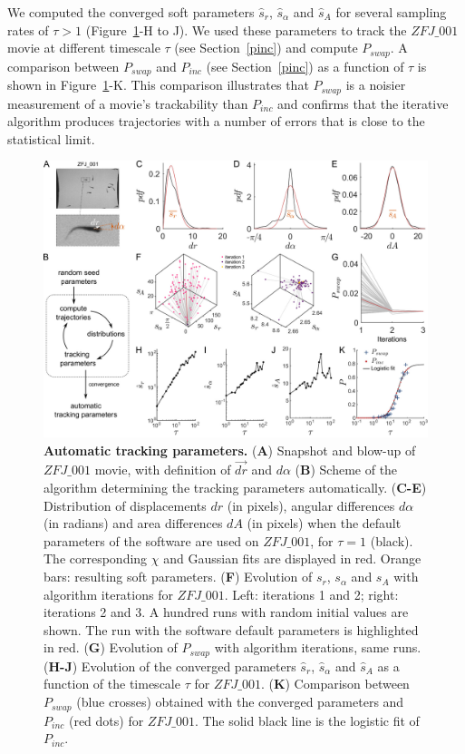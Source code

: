     We computed the converged soft parameters $\hat{s}_r$, $\hat{s}_\alpha$ and $\hat{s}_A$ for several sampling rates of $\tau>1$ (Figure~\ref{part_1:fig_5}-H to J). We used these parameters to track the $ZFJ\_001$ movie at different timescale $\tau$ (see Section~\ref{pinc}) and compute $P_{swap}$. A comparison between $P_{swap}$ and $P_{inc}$ (see Section~\ref{pinc}) as a function of $\tau$ is shown in Figure~\ref{part_1:fig_5}-K. This comparison illustrates that $P_{swap}$ is a noisier measurement of a movie's trackability than $P_{inc}$ and confirms that the iterative algorithm produces trajectories with a number of errors that is close to the statistical limit.

    \begin{figure}[h!]
    \centering
    \includegraphics[width=1\textwidth]{part_1/assets/Figure_5.png}
    \caption{{\bf Automatic tracking parameters.}
        (\textbf{A}) Snapshot and blow-up of $ZFJ\_001$ movie, with definition of $\vec{dr}$ and $d\alpha$
        (\textbf{B}) Scheme of the algorithm determining the tracking parameters automatically.
        (\textbf{C-E}) Distribution of displacements $dr$ (in pixels), angular differences $d\alpha$ (in radians) and area differences $dA$ (in pixels) when the default parameters of the software are used on $ZFJ\_001$, for $\tau=1$ (black). The corresponding $\chi$ and Gaussian fits are displayed in red. Orange bars: resulting soft parameters.
        (\textbf{F}) Evolution of $s_r$, $s_\alpha$ and $s_A$ with algorithm iterations for $ZFJ\_001$. Left: iterations 1 and 2; right: iterations 2 and 3. A hundred runs with random initial values are shown. The run with the software default parameters is highlighted in red.
        (\textbf{G}) Evolution of $P_{swap}$ with algorithm iterations, same runs.
        (\textbf{H-J}) Evolution of the converged parameters $\hat{s}_r$, $\hat{s}_\alpha$ and $\hat{s}_A$ as a function of the timescale $\tau$ for $ZFJ\_001$.
        (\textbf{K}) Comparison between $P_{swap}$ (blue crosses) obtained with the converged parameters and $P_{inc}$ (red dots) for $ZFJ\_001$. The solid black line is the logistic fit of $P_{inc}$.}
    \label{part_1:fig_5}
    \end{figure}

